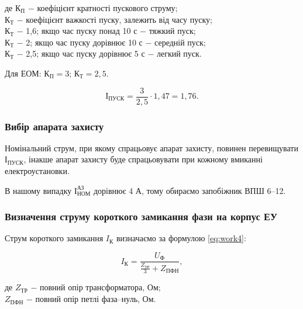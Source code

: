 \noindent де $\text{К}_{\text{П}}$ $-$ коефіцієнт кратності пускового струму; \\
\hspace*{15pt} $\text{К}_{\text{Т}}$ $-$ коефіцієнт важкості пуску, залежить від часу пуску; \\
\hspace*{15pt} $\text{К}_{\text{Т}}$ $-$ 1,6; якщо час пуску понад 10 с $-$ тяжкий пуск; \\
\hspace*{15pt} $\text{К}_{\text{Т}}$ $-$ 2; якщо час пуску дорівнює 10 с $-$ середній пуск; \\
\hspace*{15pt} $\text{К}_{\text{Т}}$ $-$ 2,5; якщо час пуску дорівнює 5 с $-$ легкий пуск. \\

\vspace{1.5em}

Для ЕОМ: $\text{К}_{\text{П}} = 3; \, \text{К}_{\text{Т}} = 2,5$.

\[
	І_{\text{ПУСК}} = \frac{3}{2,5} \cdot 1,47 = 1,76.
\]

\vspace{1.5em}

\subsubsection{Вибір апарата захисту}

Номінальний струм, при якому спрацьовує апарат захисту, повинен перевищувати $\text{І}_{\text{ПУСК}}$, інакше апарат захисту буде спрацьовувати при кожному вмиканні електроустановки.

В нашому випадку $\text{І}^{\text{АЗ}}_{\text{НОМ}}$ дорівнює 4 А, тому обираємо запобіжник ВПШ 6–12.

\subsubsection{Визначення струму короткого замикання фази на корпус ЕУ}

Струм короткого замикання $I_{\text{К}}$ визначаємо за формулою \ref{eq:work4}:

\begin{equation}\label{eq:work4}
	I_{\text{К}} = \frac{U_{\text{Ф}}}{\frac{Z_{\text{ТР}}}{3} + Z_{\text{ПФН}}},
\end{equation}

\noindent де $Z_{\text{ТР}}$ $-$ повний опір трансформатора, Ом; \\
\hspace*{15pt} $Z_{\text{ПФН}}$ $-$ повний опір петлі фаза–нуль, Ом.

